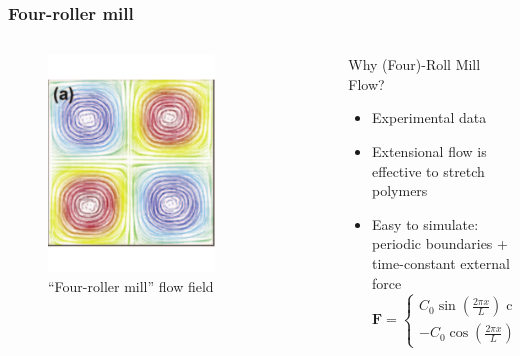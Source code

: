 \begin{frame}
  \frametitle{Four-roller mill}
  \begin{columns}
    \begin{column}{0.3\textwidth}
      \begin{figure}[t]
        \centering
        \includegraphics[width=0.7\textwidth]{img/4roll.pdf}
        \caption{``Four-roller mill'' flow field}
        \label{fig:snap}
      \end{figure}
    \end{column}
    \begin{column}{0.7\textwidth}
      \begin{block}{Why (Four)-Roll Mill Flow?}
        \begin{itemize}
        \item Experimental data
        \item Extensional flow is effective to  stretch polymers
        \item Easy to simulate: periodic boundaries + time-constant external force
          \begin{equation*}
            \mathbf{F}=\left\{\begin{matrix}
                C_0\sin(\frac{2\pi x} {L})\cos(\frac{2\pi y} {L})
                \\ 
                -C_0\cos(\frac{2\pi x} {L})\sin(\frac{2\pi y} {L})
              \end{matrix}\right.
   \end{equation*}
     \end{itemize}
      \end{block}
    \end{column}
  \end{columns}
\end{frame}

